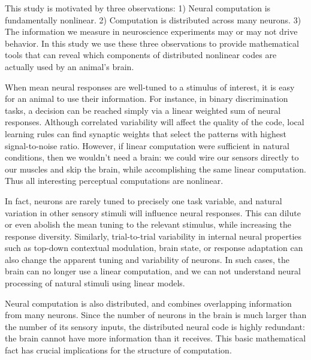 \documentclass[11pt,twocolumn]{article}
\begin{document}

This study is motivated by three observations: 1) Neural computation is fundamentally nonlinear. 2) Computation is distributed across many neurons. 3) The information we measure in neuroscience experiments may or may not drive behavior. In this study we use these three observations to provide mathematical tools that can reveal which components of distributed nonlinear codes are actually used by an animal's brain.

When mean neural responses are well-tuned to a stimulus of interest, it is easy for an animal to use their information. For instance, in binary discrimination tasks, a decision can be reached simply via a linear weighted sum of neural responses. Although correlated variability will affect the quality of the code, local learning rules can find synaptic weights that select the patterns with highest signal-to-noise ratio. However, if linear computation were sufficient in natural conditions, then we wouldn't need a brain: we could wire our sensors directly to our muscles and skip the brain, while accomplishing the same linear computation. Thus all interesting perceptual computations are nonlinear.

In fact, neurons are rarely tuned to precisely one task variable, and natural variation in other sensory stimuli will influence neural responses. This can dilute or even abolish the mean tuning to the relevant stimulus, while increasing the response diversity. Similarly, trial-to-trial variability in internal neural properties such as top-down contextual modulation, brain state, or response adaptation can also change the apparent tuning and variability of neurons. In such cases, the brain can no longer use a linear computation, and we can not understand neural processing of natural stimuli using linear models.

Neural computation is also distributed, and combines overlapping information from many neurons. Since the number of neurons in the brain is much larger than the number of its sensory inputs, the distributed neural code is highly redundant: the brain cannot have more information than it receives. This basic mathematical fact has crucial implications for the structure of computation.
\end{document}
